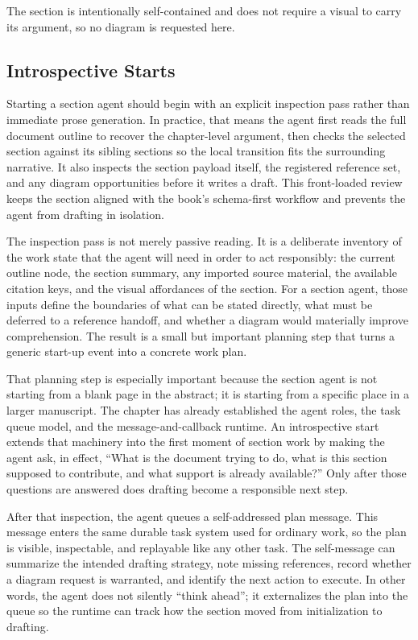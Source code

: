 \documentclass[11pt]{article}
\begin{document}
The section is intentionally self-contained and does not require a visual to carry its argument, so no diagram is requested here.



\subsection{Introspective Starts}


Starting a section agent should begin with an explicit inspection pass rather than immediate prose generation. In practice, that means the agent first reads the full document outline to recover the chapter-level argument, then checks the selected section against its sibling sections so the local transition fits the surrounding narrative. It also inspects the section payload itself, the registered reference set, and any diagram opportunities before it writes a draft. This front-loaded review keeps the section aligned with the book's schema-first workflow and prevents the agent from drafting in isolation.

The inspection pass is not merely passive reading. It is a deliberate inventory of the work state that the agent will need in order to act responsibly: the current outline node, the section summary, any imported source material, the available citation keys, and the visual affordances of the section. For a section agent, those inputs define the boundaries of what can be stated directly, what must be deferred to a reference handoff, and whether a diagram would materially improve comprehension. The result is a small but important planning step that turns a generic start-up event into a concrete work plan.

That planning step is especially important because the section agent is not starting from a blank page in the abstract; it is starting from a specific place in a larger manuscript. The chapter has already established the agent roles, the task queue model, and the message-and-callback runtime. An introspective start extends that machinery into the first moment of section work by making the agent ask, in effect, ``What is the document trying to do, what is this section supposed to contribute, and what support is already available?'' Only after those questions are answered does drafting become a responsible next step.

After that inspection, the agent queues a self-addressed plan message. This message enters the same durable task system used for ordinary work, so the plan is visible, inspectable, and replayable like any other task. The self-message can summarize the intended drafting strategy, note missing references, record whether a diagram request is warranted, and identify the next action to execute. In other words, the agent does not silently ``think ahead''; it externalizes the plan into the queue so the runtime can track how the section moved from initialization to drafting.
\end{document}

